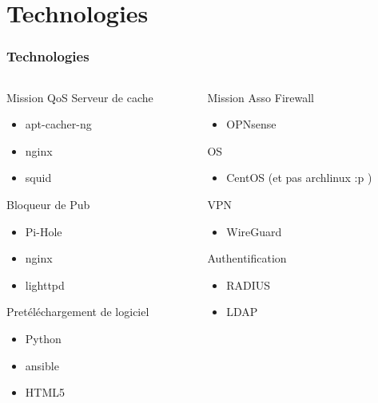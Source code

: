 \documentclass[9pt]{beamer}
\begin{document}
\section{Technologies}
\begin{frame}
    \frametitle{Technologies}
    \begin{columns}[T]
        \begin{column}{0.5\textwidth}
            \begin{block}{Mission QoS}
            Serveur de cache
            \begin{itemize}
                \item{apt-cacher-ng}
                \item{nginx}
                \item{squid}
            \end{itemize}
            Bloqueur de Pub
            \begin{itemize}
                \item{Pi-Hole}
                \item{nginx}
                \item{lighttpd}
            \end{itemize}
            Pretéléchargement de logiciel
            \begin{itemize}
                \item{Python}
                \item{ansible}
                \item{HTML5}
            \end{itemize}
            \end{block}
        \end{column}
        \begin{column}{0.5\textwidth}
            \begin{block}{Mission Asso}
            Firewall
            \begin{itemize}
                \item{OPNsense}
            \end{itemize}
            OS
            \begin{itemize}
                \item{CentOS (et pas archlinux :p )}
            \end{itemize}
            VPN
            \begin{itemize}
                \item{WireGuard}
            \end{itemize}
            Authentification
            \begin{itemize}
                \item{RADIUS}
                \item{LDAP}
            \end{itemize}
            \end{block}
        \end{column}
    \end{columns}
\end{frame}

%
%
\end{document}
